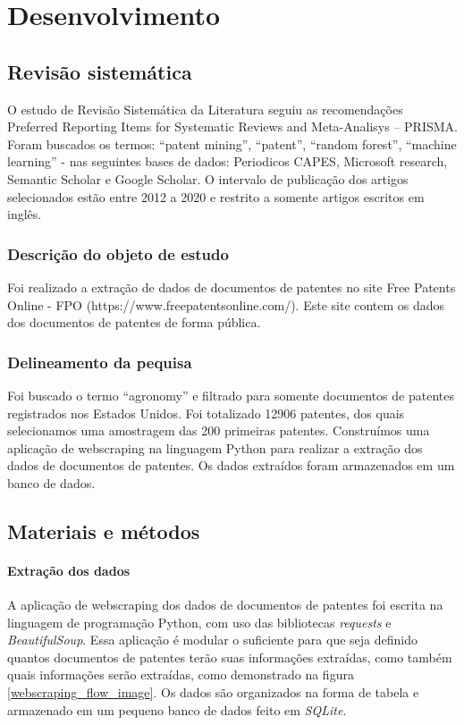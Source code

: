 

\chapter{Desenvolvimento}\label{cap_exemplos}

\section{Revisão sistemática}
O estudo de Revisão Sistemática da Literatura seguiu as recomendações Preferred Reporting Items for Systematic Reviews and Meta-Analisys – PRISMA.
Foram buscados os termos: “patent mining”, “patent”, “random forest”, “machine learning” - nas seguintes bases de dados: Periodicos CAPES, Microsoft research, Semantic Scholar e Google Scholar. O intervalo de publicação dos artigos selecionados estão entre 2012 a 2020 e restrito a somente artigos escritos em inglês.

\subsection{Descrição do objeto de estudo}
Foi realizado a extração de dados de documentos de patentes no site Free Patents Online - FPO (https://www.freepatentsonline.com/). Este site contem os dados dos documentos de patentes de forma pública.

\subsection{Delineamento da pequisa}
Foi buscado o termo “agronomy” e filtrado para somente documentos de patentes registrados nos Estados Unidos. Foi totalizado 12906 patentes, dos quais selecionamos uma amostragem das 200 primeiras patentes. Construímos uma aplicação de webscraping na linguagem Python para realizar a extração dos dados de documentos de patentes.  Os dados extraídos foram armazenados em um banco de dados.

\section{Materiais e métodos}

\subsubsection{Extração dos dados}
A aplicação de webscraping dos dados de documentos de patentes foi escrita na linguagem de programação Python, com uso das bibliotecas \textit{requests} e \textit{BeautifulSoup}. Essa aplicação é modular o suficiente para que seja definido quantos documentos de patentes terão suas informações extraídas, como também quais informações serão extraídas, como demonstrado na figura \ref{webscraping_flow_image}. Os dados são organizados na forma de tabela e armazenado em um pequeno banco de dados feito em \textit{SQLite}.


